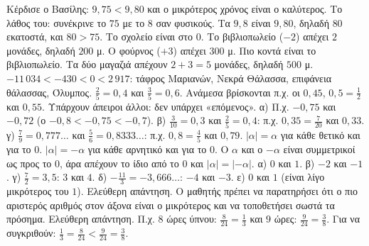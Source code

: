  Κέρδισε ο Βασίλης: $9{,}75<9{,}80$ και ο μικρότερος χρόνος είναι ο καλύτερος. Το λάθος του: συνέκρινε το $75$ με το $8$ σαν φυσικούς. Τα $9{,}8$ είναι $9{,}80$, δηλαδή $80$ εκατοστά, και $80>75$.
 Το σχολείο είναι στο $0$. Το βιβλιοπωλείο ($-2$) απέχει $2$ μονάδες, δηλαδή $200$ μ. Ο φούρνος ($+3$) απέχει $300$ μ. Πιο κοντά είναι το βιβλιοπωλείο. Τα δύο μαγαζιά απέχουν $2+3=5$ μονάδες, δηλαδή $500$ μ.
 $-11\,034<-430<0<2\,917$: τάφρος Μαριανών, Νεκρά Θάλασσα, επιφάνεια θάλασσας, Όλυμπος.
 $\frac{2}{5}=0{,}4$ και $\frac{3}{5}=0{,}6$. Ανάμεσα βρίσκονται π.χ. οι $0{,}45$, $0{,}5=\frac{1}{2}$ και $0{,}55$. Υπάρχουν άπειροι άλλοι: δεν υπάρχει «επόμενος».
 α) Π.χ. $-0{,}75$ και $-0{,}72$ (ο $-0{,}8<-0{,}75<-0{,}7$). β) $\frac{3}{10}=0{,}3$ και $\frac{2}{5}=0{,}4$: π.χ. $0{,}35=\frac{7}{20}$ και $0{,}33$. γ) $\frac{7}{9}=0{,}777\ldots$ και $\frac{5}{6}=0{,}8333\ldots$: π.χ. $0{,}8=\frac{4}{5}$ και $0{,}79$.
 $|\alpha|=\alpha$ για κάθε θετικό και για το $0$. $|\alpha|=-\alpha$ για κάθε αρνητικό και για το $0$. Ο $\alpha$ και ο $-\alpha$ είναι συμμετρικοί ως προς το $0$, άρα απέχουν το ίδιο από το $0$ και $|\alpha|=|-\alpha|$.
 α) $0$ και $1$. β) $-2$ και $-1$. γ) $\frac{7}{2}=3{,}5$: $3$ και $4$. δ) $-\frac{11}{3}=-3{,}666\ldots$: $-4$ και $-3$. ε) $0$ και $1$ (είναι λίγο μικρότερος του $1$).
 Ελεύθερη απάντηση. Ο μαθητής πρέπει να παρατηρήσει ότι ο πιο αριστερός αριθμός στον άξονα είναι ο μικρότερος και να τοποθετήσει σωστά τα πρόσημα.
 Ελεύθερη απάντηση. Π.χ. $8$ ώρες ύπνου: $\frac{8}{24}=\frac{1}{3}$ και $9$ ώρες: $\frac{9}{24}=\frac{3}{8}$. Για να συγκριθούν: $\frac{1}{3}=\frac{8}{24}<\frac{9}{24}=\frac{3}{8}$.

